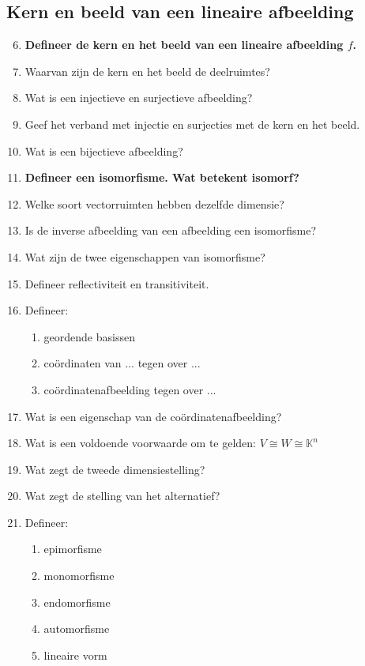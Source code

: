 \documentclass[12pt]{article}
\begin{document}
    \subsection{Kern en beeld van een lineaire afbeelding}
    \begin{enumerate}
        \setcounter{enumi}{5}
        \item \textbf{Defineer de kern en het beeld van een lineaire afbeelding $f$.}
        \item Waarvan zijn de kern en het beeld de deelruimtes?
        \item Wat is een injectieve en surjectieve afbeelding?
        \item Geef het verband met injectie en surjecties met de kern en het beeld.
        \item Wat is een bijectieve afbeelding?
        \item \textbf{Defineer een isomorfisme. Wat betekent isomorf?}
        \item Welke soort vectorruimten hebben dezelfde dimensie?
        \item Is de inverse afbeelding van een afbeelding een isomorfisme?
        \item Wat zijn de twee eigenschappen van isomorfisme?
        \item Defineer reflectiviteit en transitiviteit.
        \item Defineer: \begin{enumerate}
            \item geordende basissen
            \item coördinaten van ... tegen over ... 
            \item coördinatenafbeelding tegen over ... 
        \end{enumerate}
        \item Wat is een eigenschap van de coördinatenafbeelding?
        \item Wat is een voldoende voorwaarde om te gelden: $V\cong W \cong \mathbb{K}^n$
        \item Wat zegt de tweede dimensiestelling?
        \item Wat zegt de stelling van het alternatief?
        \item Defineer: \begin{enumerate}
            \item epimorfisme
            \item monomorfisme
            \item endomorfisme
            \item automorfisme
            \item lineaire vorm 
        \end{enumerate}
    \end{enumerate}
\end{document}
